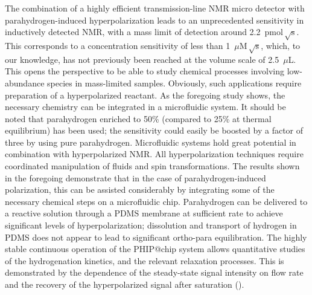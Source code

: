 The combination of a
highly efficient transmission-line NMR micro detector with para\-hyd\-ro\-gen-in\-duced
hyper\-polarization leads to an un\-precedented sensitivity in inductively detected
NMR, with a mass limit of detection around 2.2~$\text{pmol}\,\sqrt{\mathrm{s}}$.
This corresponds to a concentration sensitivity of less than 1~$\mu \mathrm{M}\,\sqrt{\text{s}}$,
which, to our knowledge, has not previously been reached at the volume
scale of 2.5~$\mu$L.
This opens the perspective to be able to study chemical processes involving
low-abundance species in mass-limited samples. Obviously, such applications
require preparation of a hyperpolarized reactant. As the foregoing study shows,
the necessary chemistry can be integrated in a microfluidic system.
It should be noted that
parahydrogen enriched to 50\% (compared to 25\%
at thermal equilibrium) has been used; the sensitivity
could easily be boosted by a factor of three by using pure parahydrogen.
Microfluidic systems hold great potential in combination
with hyperpolarized NMR. All hyperpolarization techniques require coordinated
manipulation of fluids and spin transformations. The results shown in the
foregoing demonstrate that in the case of parahydrogen-induced polarization,
this can be assisted considerably by integrating some of the necessary chemical
steps on a microfluidic chip. Parahydrogen can be delivered to a reactive
solution through a PDMS membrane at sufficient rate to achieve significant
levels of hyperpolarization; dissolution and transport of hydrogen in PDMS does
not appear to lead to significant ortho-para equilibration.
The highly stable continuous operation
of the PHIP@chip system allows quantitative studies
of the hydrogenation kinetics, and the relevant relaxation processes.
This is demonstrated by the dependence of the steady-state signal intensity on
flow rate and the recovery of the
hyperpolarized signal after saturation ().

